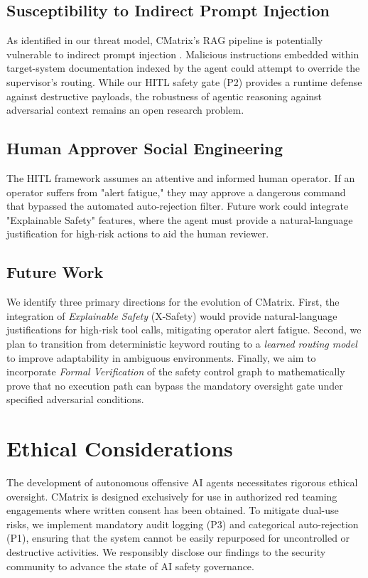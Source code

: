 \documentclass[conference,compsoc]{IEEEtran}
\begin{document}
\subsection{Susceptibility to Indirect Prompt Injection}
As identified in our threat model, CMatrix's RAG pipeline is potentially vulnerable to indirect prompt injection \cite{greshake}. Malicious instructions embedded within target-system documentation indexed by the agent could attempt to override the supervisor's routing. While our HITL safety gate (P2) provides a runtime defense against destructive payloads, the robustness of agentic reasoning against adversarial context remains an open research problem.

\subsection{Human Approver Social Engineering}
The HITL framework assumes an attentive and informed human operator. If an operator suffers from "alert fatigue," they may approve a dangerous command that bypassed the automated auto-rejection filter. Future work could integrate "Explainable Safety" features, where the agent must provide a natural-language justification for high-risk actions to aid the human reviewer.

\subsection{Future Work}
We identify three primary directions for the evolution of CMatrix. First, the integration of \textit{Explainable Safety} (X-Safety) would provide natural-language justifications for high-risk tool calls, mitigating operator alert fatigue. Second, we plan to transition from deterministic keyword routing to a \textit{learned routing model} to improve adaptability in ambiguous environments. Finally, we aim to incorporate \textit{Formal Verification} of the safety control graph to mathematically prove that no execution path can bypass the mandatory oversight gate under specified adversarial conditions.

\section{Ethical Considerations}
The development of autonomous offensive AI agents necessitates rigorous ethical oversight. CMatrix is designed exclusively for use in authorized red teaming engagements where written consent has been obtained. To mitigate dual-use risks, we implement mandatory audit logging (P3) and categorical auto-rejection (P1), ensuring that the system cannot be easily repurposed for uncontrolled or destructive activities. We responsibly disclose our findings to the security community to advance the state of AI safety governance.
\end{document}
